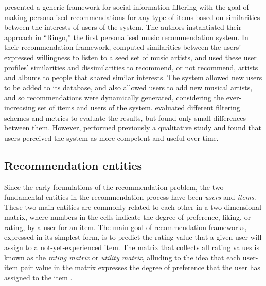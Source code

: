 \textcite{shardanand95social} presented a generic framework for social information filtering with the goal of making personalised recommendations for any type of items based on similarities between the interests of users of the system. The authors instantiated their approach in ``Ringo,'' the first personalised music recommendation system. In their recommendation framework, \citeauthor{shardanand95social} computed similarities between the  users' expressed willingness to listen to a seed set of music artists, and used these user profiles' similarities and dissimilarities to recommend, or not recommend, artists and albums to people that shared similar interests. 
The system allowed new users to be added to its database, and also allowed users to add new musical artists, and so recommendations were dynamically generated, considering the ever-increasing set of items and users of the system.
\citeauthor{shardanand95social} evaluated different filtering schemes and metrics to evaluate the results, but found only small differences between them. However, \textcite{shardanand94social} performed previously a qualitative study and found that users perceived the system as more competent and useful over time.





\subsection{Recommendation entities}
Since the early formulations of the recommendation problem, the two fundamental entities in the recommendation process have been \emph{users} and \emph{items}. 
These two main entities are commonly related to each other in a two-dimen\-sional matrix, where numbers in the cells indicate the degree of preference, liking, or rating, by a user for an item.
The main goal of recommendation frameworks, expressed in its simplest form, is to predict the rating value that a given user will assign to a not-yet-experienced item.
The matrix that collects all rating values is known as the \textit{rating matrix} or \textit{utility matrix}, alluding to the idea that each user-item pair value in the matrix expresses the degree of preference that the user has assigned to the item \autocite{leskovec14mining}.


